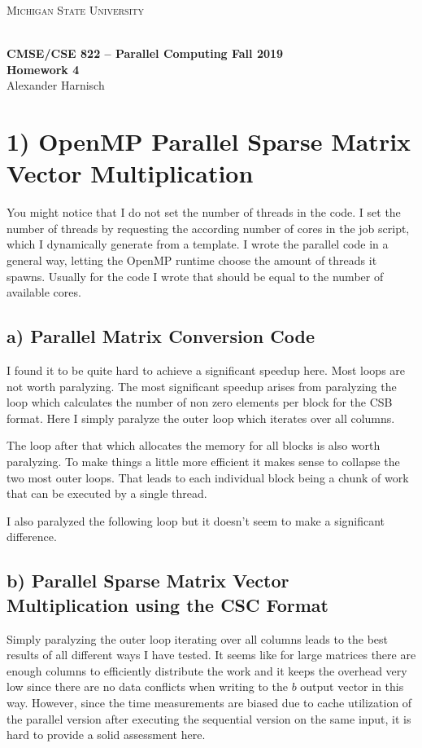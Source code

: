 \documentclass[a4paper, 11pt]{article}
\begin{document}
\noindent
\centerline{\small{\textsc{Michigan State University}}} \\
\large{\textbf{CMSE/CSE 822 – Parallel Computing \hfill Fall 2019 \\
Homework 4}} \\
Alexander Harnisch \\
\noindent\makebox[\linewidth]{\rule{\textwidth}{0.4pt}}

\section*{1) OpenMP Parallel Sparse Matrix Vector Multiplication}
You might notice that I do not set the number of threads in the code. I set the
number of threads by requesting the according number of cores in the job
script, which I dynamically generate from a template. I wrote the parallel code
in a general way, letting the OpenMP runtime choose the amount of threads it
spawns. Usually for the code I wrote that should be equal to the number of
available cores.
 
\subsection*{a) Parallel Matrix Conversion Code}
I found it to be quite hard to achieve a significant speedup here. Most loops
are not worth paralyzing. The most significant speedup arises from paralyzing
the loop which calculates the number of non zero elements per block for the CSB
format. Here I simply paralyze the outer loop which iterates over all columns. 

The loop after that which allocates the memory for all blocks is also worth
paralyzing. To make things a little more efficient it makes sense to collapse
the two most outer loops. That leads to each individual block being a chunk of
work that can be executed by a single thread. 

I also paralyzed the following loop but it doesn't seem to make a significant
difference.

\subsection*{b) Parallel Sparse Matrix Vector Multiplication using the CSC Format}
Simply paralyzing the outer loop iterating over all columns leads to the best
results of all different ways I have tested. It seems like for large matrices
there are enough columns to efficiently distribute the work and it keeps the
overhead very low since there are no data conflicts when writing to the $b$
output vector in this way. However, since the time measurements are biased due
to cache utilization of the parallel version after executing the sequential
version on the same input, it is hard to provide a solid assessment here.
\end{document}

